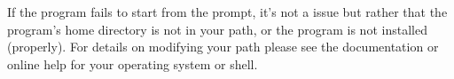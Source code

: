 If the program fails to start from the prompt, it's not a 
issue but rather that the program's home directory is not in your
path, or the program is not installed (properly).  For details on
modifying your path please see the documentation or online help for
your operating system or shell.
    


